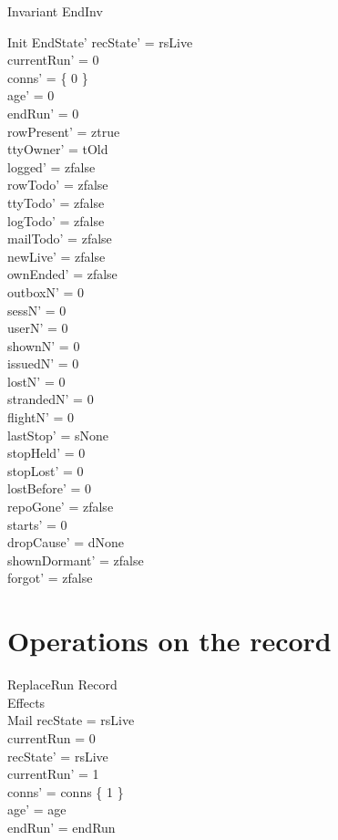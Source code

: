 \documentclass[a4paper,10pt,fleqn]{article}
\begin{document}
\begin{schema}{Invariant}
  EndInv
\end{schema}

\begin{schema}{Init}
  EndState'
  \where
  recState' = rsLive \\
  currentRun' = 0 \\
  conns' = \{ 0 \} \\
  age' = 0 \\
  endRun' = 0 \\
  rowPresent' = ztrue \\
  ttyOwner' = tOld \\
  logged' = zfalse \\
  rowTodo' = zfalse \\
  ttyTodo' = zfalse \\
  logTodo' = zfalse \\
  mailTodo' = zfalse \\
  newLive' = zfalse \\
  ownEnded' = zfalse \\
  outboxN' = 0 \\
  sessN' = 0 \\
  userN' = 0 \\
  shownN' = 0 \\
  issuedN' = 0 \\
  lostN' = 0 \\
  strandedN' = 0 \\
  flightN' = 0 \\
  lastStop' = sNone \\
  stopHeld' = 0 \\
  stopLost' = 0 \\
  lostBefore' = 0 \\
  repoGone' = zfalse \\
  starts' = 0 \\
  dropCause' = dNone \\
  shownDormant' = zfalse \\
  forgot' = zfalse
\end{schema}

\section{Operations on the record}

\begin{schema}{ReplaceRun}
  \Delta Record \\
  \Xi Effects \\
  \Xi Mail
  \where
  recState = rsLive \\
  currentRun = 0 \\
  recState' = rsLive \\
  currentRun' = 1 \\
  conns' = conns \cup \{ 1 \} \\
  age' = age \\
  endRun' = endRun
\end{schema}
\end{document}
